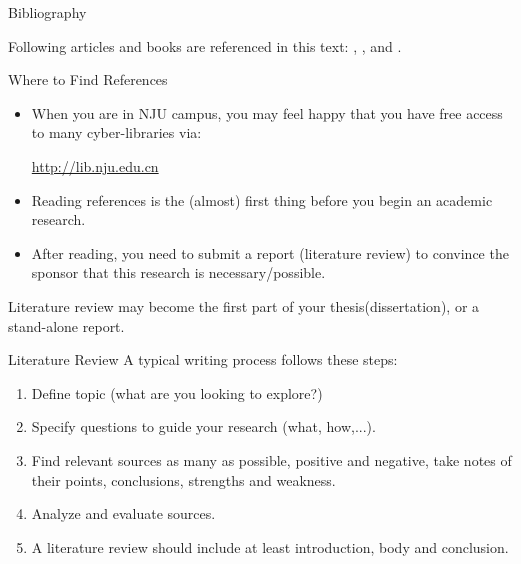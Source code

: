 \documentclass[10pt,t]{beamer}
\begin{document}
\begin{frame}{Bibliography}

 Following articles and books are referenced in this text:
    \cite{Knuth_texbook}, \cite{texmanual}, \cite{David_tex_land} and
    \cite{oetiker2015}.

    
    
\end{frame}

\iffalse
\begin{frame}{Where to Find References}
\begin{itemize}
    \item When you are in NJU campus, you may feel happy that you have
    free access to many cyber-libraries via:

    \url{http://lib.nju.edu.cn} \\[2ex]
    \item Reading references is the (almost) first thing before
        you begin an academic research.
    \item After reading, you need to submit a report (literature review)
        to convince the sponsor that this research is necessary/possible.
\end{itemize}
Literature review may become the first part of your thesis(dissertation),
or a stand-alone report.
\end{frame}

\begin{frame}{Literature Review}
A typical writing process follows these steps:
\begin{enumerate}
    \item Define topic (what are you looking to explore?)
    \item Specify questions to guide your research (what, how,...).
    \item Find relevant sources as many as possible, positive
        and negative, take notes of their points, conclusions,
        strengths and weakness.
    \item Analyze and evaluate sources.
    \item A literature review should include at least introduction,
        body and conclusion.
\end{enumerate}
\end{frame}
\end{document}
